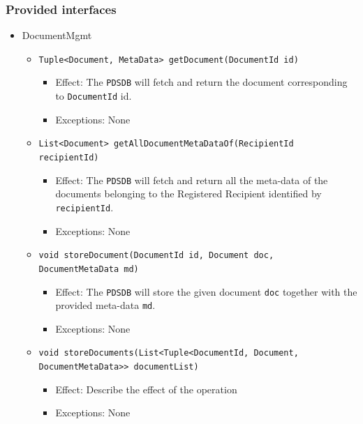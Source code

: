 \documentclass[a4paper,10pt]{article}
\begin{document}
\subsubsection*{Provided interfaces}
\begin{itemize}
    \item DocumentMgmt
    \begin{itemize}
        \item \texttt{Tuple<Document, MetaData> getDocument(DocumentId id)}
        \begin{itemize}
            \item Effect: The \texttt{PDSDB} will fetch and return the document corresponding to \texttt{DocumentId} id.
            \item Exceptions: None
         \end{itemize}
         
         \item \texttt{List<Document> getAllDocumentMetaDataOf(RecipientId recipientId)}
        \begin{itemize}
            \item Effect: The \texttt{PDSDB} will fetch and return all the meta-data of the documents belonging to the Registered Recipient identified by \texttt{recipientId}.
            \item Exceptions: None
         \end{itemize}   
		\item \texttt{void storeDocument(DocumentId id, Document doc, DocumentMetaData md)}
        \begin{itemize}
            \item Effect: The \texttt{PDSDB} will store the given document \texttt{doc} together with the provided meta-data \texttt{md}.
            \item Exceptions:  None 
        \end{itemize}
         
         \item \texttt{void storeDocuments(List<Tuple<DocumentId, Document, DocumentMetaData>> documentList)}
         \begin{itemize}
                \item Effect: Describe the effect of the operation
                \item Exceptions: None   
         \end{itemize}
         

\end{itemize}
\end{itemize}
\end{document}
